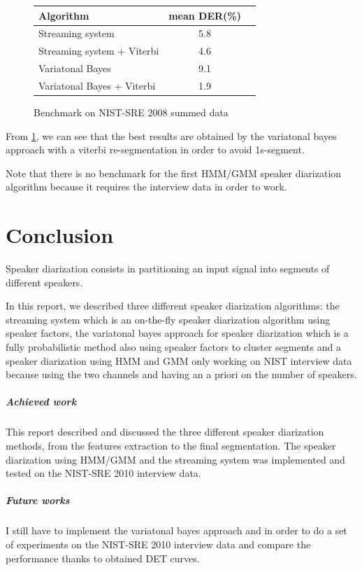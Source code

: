 \documentclass{techrep} %
\begin{document}
\begin{figure}[H]
  \centering
  \begin{tabular}{|l|c|r|}
    \hline
    \textbf{Algorithm} & \textbf{mean DER(\%)} \\
    \hline
    Streaming system & 5.8\\
    \hline
    Streaming system + Viterbi & 4.6\\
    \hline
    Variatonal Bayes & 9.1\\
    \hline
    Variatonal Bayes + Viterbi & 1.9\\
    \hline
  \end{tabular}
  \label{benchou}
  \caption{Benchmark on NIST-SRE 2008 summed data}
\end{figure}

From \ref{benchou}, we can see that the best results are obtained by the variatonal bayes approach with a viterbi re-segmentation in order to avoid 1s-segment.

Note that there is no benchmark for the first HMM/GMM speaker
diarization algorithm because it requires the interview data in order
to work.

\chapter{Conclusion}

Speaker diarization consists in partitioning an input signal into
segments of different speakers.

In this report, we described three different speaker diarization
algorithms: the streaming system which is an on-the-fly speaker
diarization algorithm using speaker factors, the variatonal bayes
approach for speaker diarization which is a fully probabilistic method
also using speaker factors to cluster segments and a speaker
diarization using HMM and GMM only working on NIST interview data
because using the two channels and having an a priori on the number of
speakers.

\paragraph{Achieved work} This report described and discussed the three different speaker diarization methods, from the features extraction to the final segmentation. The speaker diarization using HMM/GMM and the streaming system was implemented and tested on the NIST-SRE 2010 interview data.

\paragraph{Future works} I still have to implement the variatonal bayes approach and in order to do a set of experiments on the NIST-SRE 2010 interview data and compare the performance thanks to obtained DET curves.

 \nocite{*}
\end{document}
